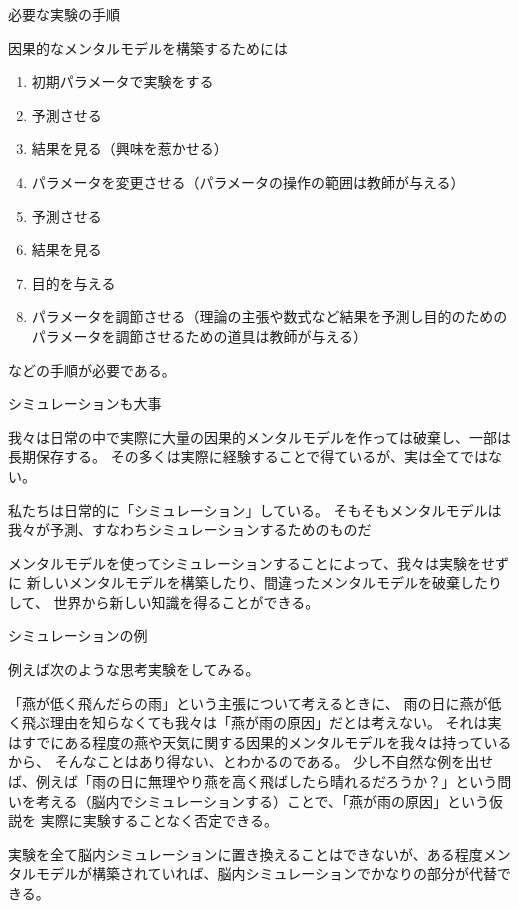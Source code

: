 \documentclass[12pt, unicode]{beamer}
\begin{document}
\begin{frame}{必要な実験の手順}

因果的なメンタルモデルを構築するためには

\begin{enumerate}
\item 初期パラメータで実験をする
\item 予測させる
\item 結果を見る（興味を惹かせる）
\item パラメータを変更させる（パラメータの操作の範囲は教師が与える）
\item 予測させる
\item 結果を見る
\item 目的を与える
\item パラメータを調節させる（理論の主張や数式など結果を予測し目的のためのパラメータを調節させるための道具は教師が与える）
\end{enumerate}

などの手順が必要である。
\end{frame}

\begin{frame}{シミュレーションも大事}

我々は日常の中で実際に大量の因果的メンタルモデルを作っては破棄し、一部は長期保存する。
その多くは実際に経験することで得ているが、実は全てではない。

私たちは日常的に「シミュレーション」している。
そもそもメンタルモデルは我々が予測、すなわちシミュレーションするためのものだ

メンタルモデルを使ってシミュレーションすることによって、我々は実験をせずに
新しいメンタルモデルを構築したり、間違ったメンタルモデルを破棄したりして、
世界から新しい知識を得ることができる。

\end{frame}
\begin{frame}{シミュレーションの例}

例えば次のような思考実験をしてみる。

「燕が低く飛んだらの雨」という主張について考えるときに、
雨の日に燕が低く飛ぶ理由を知らなくても我々は「燕が雨の原因」だとは考えない。
それは実はすでにある程度の燕や天気に関する因果的メンタルモデルを我々は持っているから、
そんなことはあり得ない、とわかるのである。
少し不自然な例を出せば、例えば「雨の日に無理やり燕を高く飛ばしたら晴れるだろうか？」という問いを考える（脳内でシミュレーションする）ことで、「燕が雨の原因」という仮説を
実際に実験することなく否定できる。

実験を全て脳内シミュレーションに置き換えることはできないが、ある程度メンタルモデルが構築されていれば、脳内シミュレーションでかなりの部分が代替できる。

\end{frame}
\end{document}
